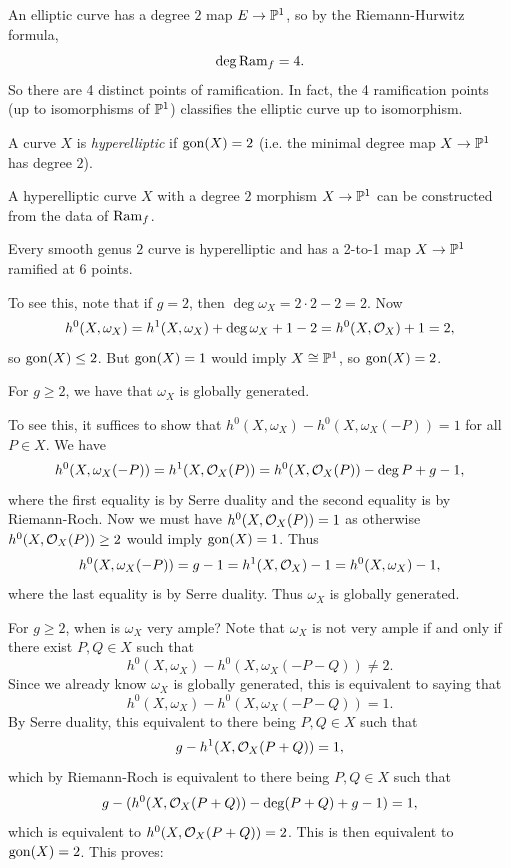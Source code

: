 \begin{remark}
  An elliptic curve has a degree $2$
  map $E \to \mathbb{P}^1$, so by the
  Riemann-Hurwitz formula,
  \[
    \deg \operatorname{Ram}_f = 4.
  \]
  So there are 4 distinct points of
  ramification. In fact, the
  4 ramification points (up to isomorphisms
  of $\mathbb{P}^1$) classifies the
  elliptic curve up to isomorphism.
\end{remark}

\begin{definition}
  A curve $X$ is \emph{hyperelliptic} if
  $\operatorname{gon}(X) = 2$ (i.e. the minimal degree
  map $X \to \mathbb{P}^1$ has degree $2$).
\end{definition}

\begin{remark}
  A hyperelliptic curve $X$ with a
  degree $2$ morphism $X \to \mathbb{P}^1$ can be
  constructed from the data of $\operatorname{Ram}_f$.
\end{remark}

\begin{example}
  Every smooth genus $2$ curve is
  hyperelliptic and has a 2-to-1 map
  $X \to \mathbb{P}^1$ ramified at 6 points.

  To see this, note that if
  $g = 2$, then $\deg \omega_X = 2 \cdot 2 - 2 = 2$.
  Now
  \[
    h^0(X, \omega_X)
    = h^1(X, \omega_X)
    + \deg \omega_X + 1 - 2
    = h^0(X, \mathcal{O}_X) + 1 = 2,
  \]
  so $\operatorname{gon}(X) \le 2$. But
  $\operatorname{gon}(X) = 1$ would imply $X \cong \mathbb{P}^1$,
  so $\operatorname{gon}(X) = 2$.
\end{example}

\begin{remark}
  For $g \ge 2$, we have
  that $\omega_X$ is globally
  generated.

  To see this, it suffices to show that
  $h^0(X, \omega_X) - h^0(X, \omega_X(-P)) = 1$
  for all $P \in X$. We have
  \[
    h^0(X, \omega_X(-P))
    = h^1(X, \mathcal{O}_X(P))
    = h^0(X, \mathcal{O}_X(P))
    - \deg P + g - 1,
  \]
  where the first equality is
  by Serre duality and the second equality
  is by Riemann-Roch. Now we must have
  $h^0(X, \mathcal{O}_X(P)) = 1$ as otherwise
  $h^0(X, \mathcal{O}_X(P)) \ge 2$ would imply
  $\operatorname{gon}(X) = 1$. Thus
  \[
    h^0(X, \omega_X(-P))
    = g - 1
    = h^1(X, \mathcal{O}_X) - 1
    = h^0(X, \omega_X) - 1,
  \]
  where the last equality is by
  Serre duality. Thus $\omega_X$ is
  globally generated.
\end{remark}

\begin{remark}
  For $g \ge 2$, when is $\omega_X$ very ample?
  Note that $\omega_X$ is not very ample
  if and only if there exist
  $P, Q \in X$ such that
  \[
    h^0(X, \omega_X)
    - h^0(X, \omega_X(-P - Q))
    \ne 2.
  \]
  Since we already know $\omega_X$ is
  globally generated, this is equivalent
  to saying that
  \[
    h^0(X, \omega_X)
    - h^0(X, \omega_X(-P - Q))
    = 1.
  \]
  By Serre duality, this equivalent to there
  being $P, Q \in X$ such that
  \[
    g - h^1(X, \mathcal{O}_X(P + Q)) = 1,
  \]
  which by Riemann-Roch is equivalent to
  there being $P, Q \in X$ such that
  \[
    g - (h^0(X, \mathcal{O}_X(P + Q)) - \deg(P + Q) + g - 1) = 1,
  \]
  which is equivalent to
  $h^0(X, \mathcal{O}_X(P + Q)) = 2$. This is
  then equivalent to $\operatorname{gon}(X) = 2$.
  This proves:
\end{remark}

